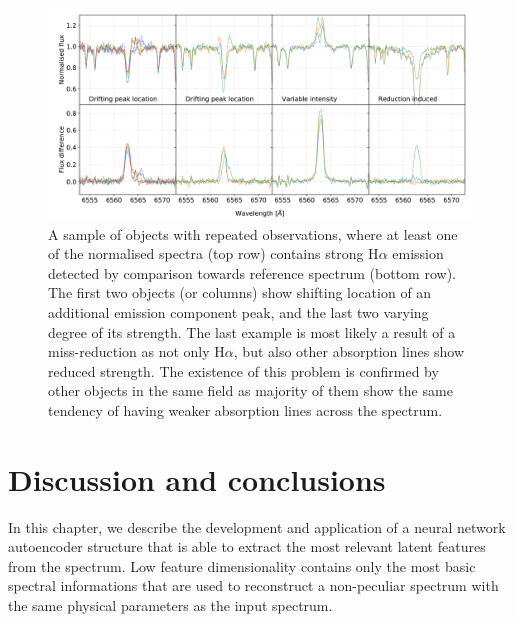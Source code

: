 \begin{figure}
	\centering
	\includegraphics[width=\textwidth]{repetas_spectra_spectra_ccd3.pdf}
	\caption{A sample of objects with repeated observations, where at least one of the normalised spectra (top row) contains strong H$\alpha$ emission detected by comparison towards reference spectrum (bottom row). The first two objects (or columns) show shifting location of an additional emission component peak, and the last two varying degree of its strength. The last example is most likely a result of a miss-reduction as not only H$\alpha$, but also other absorption lines show reduced strength. The existence of this problem is confirmed by other objects in the same field as majority of them show the same tendency of having weaker absorption lines across the spectrum.} %
	\label{fig:temporal_variab}
\end{figure}

\section{Discussion and conclusions}
\label{sec:discussion_emis} 
In this chapter, we describe the development and application of a neural network autoencoder structure that is able to extract the most relevant latent features from the spectrum. Low feature dimensionality contains only the most basic spectral informations that are used to reconstruct a non-peculiar spectrum with the same physical parameters as the input spectrum.

